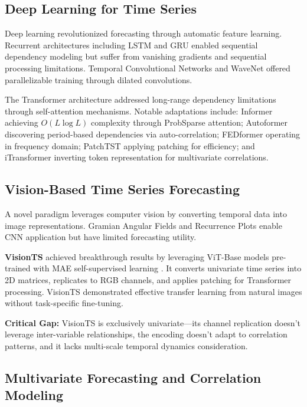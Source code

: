 \documentclass[preprint,12pt,authoryear]{elsarticle}
\begin{document}
\subsection{Deep Learning for Time Series}

Deep learning revolutionized forecasting through automatic feature learning. Recurrent architectures including LSTM \citep{hochreiter1997} and GRU \citep{cho2014} enabled sequential dependency modeling but suffer from vanishing gradients and sequential processing limitations. Temporal Convolutional Networks \citep{bai2018} and WaveNet \citep{oord2016} offered parallelizable training through dilated convolutions.

The Transformer architecture \citep{vaswani2017} addressed long-range dependency limitations through self-attention mechanisms. Notable adaptations include: Informer \citep{zhou2021informer} achieving $O(L \log L)$ complexity through ProbSparse attention; Autoformer \citep{wu2021autoformer} discovering period-based dependencies via auto-correlation; FEDformer \citep{zhou2022fedformer} operating in frequency domain; PatchTST \citep{nie2023patchtst} applying patching for efficiency; and iTransformer \citep{liu2024itransformer} inverting token representation for multivariate correlations.

\subsection{Vision-Based Time Series Forecasting}

A novel paradigm leverages computer vision by converting temporal data into image representations. Gramian Angular Fields and Recurrence Plots \citep{wang2015} enable CNN application but have limited forecasting utility. 

\textbf{VisionTS} \citep{visionts2024} achieved breakthrough results by leveraging ViT-Base models pre-trained with MAE self-supervised learning \citep{he2022mae}. It converts univariate time series into 2D matrices, replicates to RGB channels, and applies patching for Transformer processing. VisionTS demonstrated effective transfer learning from natural images without task-specific fine-tuning.

\textbf{Critical Gap:} VisionTS is exclusively univariate—its channel replication doesn't leverage inter-variable relationships, the encoding doesn't adapt to correlation patterns, and it lacks multi-scale temporal dynamics consideration.

\subsection{Multivariate Forecasting and Correlation Modeling}
\end{document}
